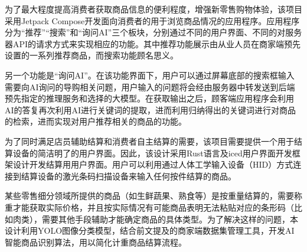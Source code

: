 为了最大程度提高消费者获取商品信息的便利程度，增强新零售购物体验，该项目采用Jetpack Compose开发面向消费者的用于浏览商品情况的应用程序。应用程序分为“推荐”“搜索”和“询问AI”三个板块，分别通过不同的用户界面、不同的对服务器API的请求方式来实现相应的功能。其中推荐功能展示由从业人员在商家端预先设置的一系列推荐商品，而搜索功能顾名思义。

另一个功能是“询问AI”。在该功能界面下，用户可以通过屏幕底部的搜索框输入需要向AI询问的导购相关问题，用户输入的问题将会经由服务器中转发送到后端预先指定的推理服务和选择的大模型。在获取输出之后，顾客端应用程序会利用AI的答复再次利用AI进行关键词的提取，进而利用归纳得出的关键词进行对商品的检索，进而实现对用户推荐相关的商品的功能。

为了同时满足店员辅助结算和消费者自主结算的需要，该项目需要提供一个用于结算设备的简洁明了的用户界面。因此，该设计采用Rust语言及iced用户界面开发框架设计开发结算用用户界面。用户可以利用通过人体工学输入设备（HID）方式连接到结算设备的激光条码扫描设备来输入任何按件结算的商品。

某些零售细分领域所提供的商品（如生鲜蔬果、熟食等）是按重量结算的，需要称重才能获取实际价格，并且按实际情况有可能商品表明无法粘贴对应的条形码（比如肉类），需要其他手段辅助才能确定商品的具体类型。为了解决这样的问题，本设计利用YOLO图像分类模型，结合前文提及的商家端数据集管理工具，开发AI智能商品识别算法，用以简化计重商品结算流程。